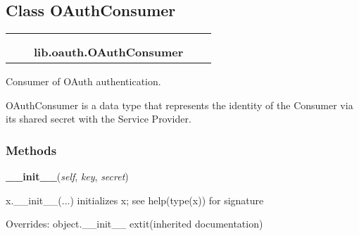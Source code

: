 
\subsection{Class OAuthConsumer}

    \label{lib:oauth:OAuthConsumer}
\begin{tabular}{cccccc}
\multicolumn{2}{r}{\settowidth{\BCL}{object}\multirow{2}{\BCL}{object}}
&&
  \\\cline{3-3}
  &&\multicolumn{1}{c|}{}
&&
  \\
&&\multicolumn{2}{l}{\textbf{lib.oauth.OAuthConsumer}}
\end{tabular}

Consumer of OAuth authentication.

OAuthConsumer is a data type that represents the identity of the Consumer 
via its shared secret with the Service Provider.



  \subsubsection{Methods}

    \vspace{0.5ex}

\hspace{.8\funcindent}\begin{boxedminipage}{\funcwidth}

    \raggedright \textbf{\_\_init\_\_}(\textit{self}, \textit{key}, \textit{secret})

\setlength{\parskip}{2ex}
    x.\_\_init\_\_(...) initializes x; see help(type(x)) for signature

\setlength{\parskip}{1ex}
      Overrides: object.\_\_init\_\_ 	extit{(inherited documentation)}

    \end{boxedminipage}


